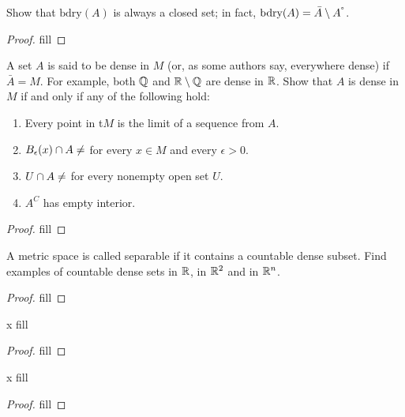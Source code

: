 \begin{exercise}{43}
Show that $\text{bdry}(A)$ is always a closed set; in fact, $\text{bdry}(A)=\bar{A}\setminus A^\text{\degree}$.
\end{exercise}
\begin{proof}
fill
\end{proof} 

\begin{exercise}{46}
A set $A$ is said to be dense in $M$ (or, as some authors say, everywhere dense) if $\bar{A}=M$. For example, both $\Q$ and $\R\setminus\Q$ are dense in $\R$. Show that $A$ is dense in $M$ if and only if any of the following hold:
\begin{enumerate}
    \item Every point in t$M$ is the limit of a sequence from $A$.
    \item $B_\epsilon(x)\cap A\neq\empty$ for every $x\in M$ and every $\epsilon>0$.
    \item $U\cap A\neq\empty$ for every nonempty open set $U$.
    \item $A^C$ has empty interior.
\end{enumerate}
\end{exercise}
\begin{proof}
fill
\end{proof} 

\begin{exercise}{48}
A metric space is called separable if it contains a countable dense subset. Find examples of countable dense sets in $\R$, in $\R^2$ and in $\R^n$.
\end{exercise}
\begin{proof}
fill
\end{proof} 

\begin{exercise}{x}
fill
\end{exercise}
\begin{proof}
fill
\end{proof} 

\begin{exercise}{x}
fill
\end{exercise}
\begin{proof}
fill
\end{proof} 
